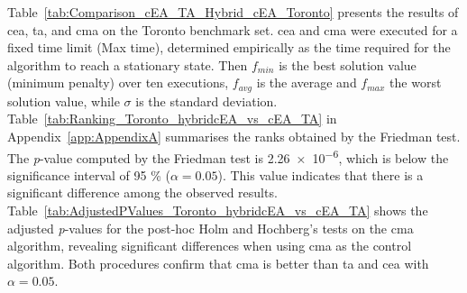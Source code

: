 Table~\ref{tab:Comparison_cEA_TA_Hybrid_cEA_Toronto} presents the results of \gls{cea}, \gls{ta}, and \gls{cma} on the Toronto benchmark set. \gls{cea} and \gls{cma} were executed for a fixed time limit (Max time), determined empirically as the time required for the algorithm to reach a stationary state. Then $f_{min}$ is the best solution value (minimum penalty) over ten executions, $f_{avg}$ is the average and $f_{max}$ the worst solution value, while $\sigma$ is the standard deviation. Table~\ref{tab:Ranking_Toronto_hybridcEA_vs_cEA_TA} in Appendix~\ref{app:AppendixA} summarises the ranks obtained by the Friedman test. The \textit{p}-value computed by the Friedman test is \num{2.26e-6}, which is below the significance interval of 95 \% ($\alpha = 0.05$). This value indicates that there is a significant difference among the observed results. Table~\ref{tab:AdjustedPValues_Toronto_hybridcEA_vs_cEA_TA} shows the adjusted \textit{p}-values for the post-hoc Holm and Hochberg's tests on the \gls{cma} algorithm, revealing significant differences when using \gls{cma} as the control algorithm. Both procedures confirm that \gls{cma} is better than \gls{ta} and \gls{cea} with $\alpha = 0.05$.



